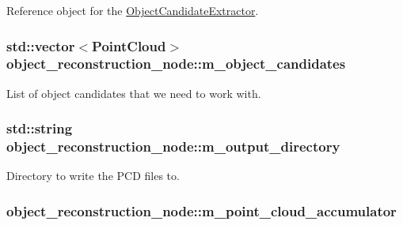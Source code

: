 \-Reference object for the \hyperlink{class_object_candidate_extractor}{\-Object\-Candidate\-Extractor}. 

\hypertarget{classobject__reconstruction__node_a1c2d6c9c999230706a087a87aca78cce}{
\subsubsection[{m\-\_\-object\-\_\-candidates}]{\setlength{\rightskip}{0pt plus 5cm}std\-::vector$<${\bf \-Point\-Cloud}$>$ {\bf object\-\_\-reconstruction\-\_\-node\-::m\-\_\-object\-\_\-candidates}}}\label{classobject__reconstruction__node_a1c2d6c9c999230706a087a87aca78cce}


\-List of object candidates that we need to work with. 

\hypertarget{classobject__reconstruction__node_a4177671d10573e28564ba3945bb05cb5}{
\subsubsection[{m\-\_\-output\-\_\-directory}]{\setlength{\rightskip}{0pt plus 5cm}std\-::string {\bf object\-\_\-reconstruction\-\_\-node\-::m\-\_\-output\-\_\-directory}}}\label{classobject__reconstruction__node_a4177671d10573e28564ba3945bb05cb5}


\-Directory to write the \-P\-C\-D files to. 

\hypertarget{classobject__reconstruction__node_aa3895b09cfc1f4e4ace4f7c28515b89d}{
\subsubsection[{m\-\_\-point\-\_\-cloud\-\_\-accumulator}]{ {\bf object\-\_\-reconstruction\-\_\-node\-::m\-\_\-point\-\_\-cloud\-\_\-accumulator}}}\label{classobject__reconstruction__node_aa3895b09cfc1f4e4ace4f7c28515b89d}


